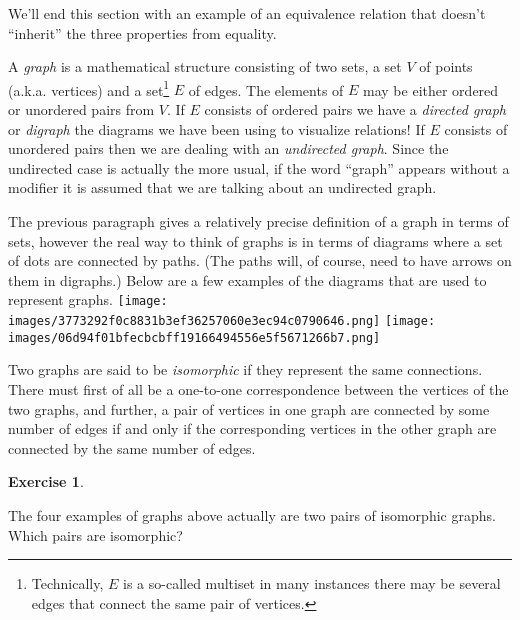 \documentclass[10pt,]{book}
\theoremstyle{plain}
\theoremstyle{definition}
\theoremstyle{definition}
\newtheorem{exercise}[theorem]{Exercise}
\numberwithin{equation}{section}
\begin{document}
    We'll end this section with an example of an equivalence relation that
    doesn't ``inherit'' the three properties from equality.
\par

    A  \emph{graph} is a mathematical structure consisting of
    two sets, a set \(V\) of points (a.k.a. vertices) and a set\footnote{Technically, \(E\) is a so-called
    multiset in many instances \textemdash{} there may be several edges that connect the same pair of vertices.\label{fn-38}} \(E\) of edges.
    The elements of \(E\) may be either ordered or unordered pairs from \(V\).
    If \(E\) consists of ordered pairs we have a 
    \emph{directed graph} or \emph{digraph} \textemdash{} the diagrams we have been using to visualize
    relations! If \(E\) consists of unordered
    pairs then we are dealing with an \emph{undirected graph}. Since the
    undirected case is actually the more usual, if the word ``graph'' appears without
    a modifier it is assumed that we are talking about an undirected graph.
\par

    The previous paragraph gives a relatively precise definition of a graph
    in terms of sets, however the real way to think of graphs is in terms
    of diagrams where a set of dots are connected by paths. (The paths will,
    of course, need to
    have arrows on them in digraphs.) Below are a few examples of the
    diagrams that are used to represent graphs.
\texttt{[image: images/3773292f0c8831b3ef36257060e3ec94c0790646.png]}
\texttt{[image: images/06d94f01bfecbcbff19166494556e5f5671266b7.png]}
\par

    Two graphs are said to be  \emph{isomorphic} if they
    represent the same connections. There must first of all be a one-to-one correspondence
    between the vertices of the two graphs, and further, a pair of vertices in one
    graph are connected by some number of edges if and only if the corresponding vertices in the other graph
    are connected by the same number of edges.
\begin{exercise}\label{exercise-52}

        The four examples of graphs above actually are two pairs of isomorphic graphs.
        Which pairs are isomorphic?
\end{exercise}
\par
\end{document}
